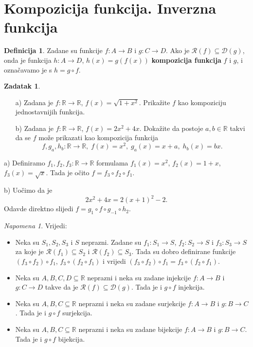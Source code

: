 \documentclass{book}
\renewenvironment{proof}{%
    \vspace{-\parskip}\begin{oldproof}%
    }{%
    \end{oldproof}%
}
\theoremstyle{definition}
\theoremstyle{definition}
\newtheorem{definition}{Definicija}
\newtheorem{exercise}{Zadatak}
\theoremstyle{remark}
\newtheorem{remark}{Napomena}
\begin{document}
\section{Kompozicija funkcija. Inverzna funkcija}
\begin{definition}
Zadane su funkcije $f : A\to B$ i $g : C\to D$. Ako je $\mathcal{R}(f)\subseteq \mathcal{D}(g)$, onda je funkcija $h : A\to D$, $h(x)=g(f(x))$ \textbf{kompozicija funkcija} $f$ i $g$, i označavamo je s $h=g\circ f$.
\end{definition}
\begin{exercise} \textbf{}
\begin{itemize}
\item[a)] Zadana je $f : \mathbb{R}\to \mathbb{R}$, $f(x)=\sqrt{1+x^2}$. Prikažite $f$ kao kompoziciju jednostavnijih funkcija.
\item[b)] Zadana je $f : \mathbb{R}\to \mathbb{R}$, $f(x)=2x^2+4x$. Dokažite da postoje $a, b\in \mathbb{R}$ takvi da se $f$ može prikazati kao kompozicija funkcija $$f,g_a,h_b : \mathbb{R}\to \mathbb{R},\;f(x)=x^2,\; g_a(x)=x+a,\; h_b(x)=bx.$$
\end{itemize}
\end{exercise}
\begin{proof}[Rješenje]
a) Definiramo $f_1, f_2, f_3 : \mathbb{R}\to \mathbb{R}$ formulama $f_1(x)=x^2$, $f_2(x)=1+x$, $f_3(x)=\sqrt{x}$. Tada je očito $f=f_3\circ f_2\circ f_1$.

b) Uočimo da je
$$2x^2+4x=2(x+1)^2-2.$$
Odavde direktno slijedi $f=g_1\circ f\circ g_{-1}\circ h_2.$
\end{proof}
\begin{remark} Vrijedi:
\begin{itemize}
\item Neka su $S_1, S_2, S_3$ i $S$ neprazni. Zadane su $f_1 : S_1 \to S$, $f_2 : S_2\to S$ i $f_3 : S_3\to S$ za koje je $\mathcal{R}(f_1)\subseteq S_2$ i $\mathcal{R}(f_2)\subseteq S_3$. Tada su dobro definirane funkcije $(f_3\circ f_2)\circ f_1$, $f_3\circ (f_2\circ f_1)$ i vrijedi $(f_3\circ f_2)\circ f_1=f_3\circ (f_2\circ f_1).$
\item Neka su $A, B, C, D\subseteq \mathbb{R}$ neprazni i neka su zadane injekcije $f : A\to B$ i $g : C\to D$ takve da je $\mathcal{R}(f)\subseteq \mathcal{D}(g)$. Tada je i $g\circ f$ injekcija.
\item Neka su $A, B, C\subseteq \mathbb{R}$ neprazni i neka su zadane surjekcije $f : A\to B$ i $g : B\to C$. Tada je i $g\circ f$ surjekcija.
\item Neka su $A, B, C\subseteq \mathbb{R}$ neprazni i neka su zadane bijekcije $f : A\to B$ i $g : B\to C$. Tada je i $g\circ f$ bijekcija.
\end{itemize}
\end{remark}
\end{document}
